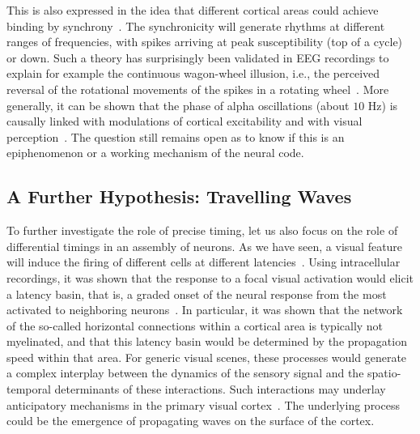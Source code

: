 \documentclass[brainsci, %
               review,accept,pdftex,moreauthors
               ]{Definitions/mdpi}
\begin{document}
This is also expressed in the idea that different cortical areas could achieve binding by synchrony~\citep{fries_mechanism_2005}. The synchronicity will generate rhythms at different ranges of frequencies, with spikes arriving at peak susceptibility (top of a cycle) or down. Such a theory has surprisingly been validated in EEG recordings to explain for example the continuous wagon-wheel illusion, i.e., the perceived reversal of the rotational movements of the spikes in a rotating wheel~\citep{vanrullen_continuous_2006}. More generally, it can be shown that the phase of alpha oscillations (about $10$ Hz) is causally linked with modulations of cortical excitability and with visual perception~\citep{dugue_phase_2011}. The question still remains open as to know if this is an epiphenomenon or a working mechanism of the neural code.
%
\subsection{A Further Hypothesis: Travelling Waves}
%
To further investigate the role of precise timing, let us also focus on the role of differential timings in an assembly of neurons. As we have seen, a visual feature will induce the firing of different cells at different latencies~\citep{celebrini_dynamics_1993}. Using intracellular recordings, it was shown that the response to a focal visual activation would elicit a latency basin, that is, a graded onset of the neural response from the most activated to neighboring neurons~\citep{bringuier_horizontal_1999}. In particular, it was shown that the network of the so-called horizontal connections within a cortical area is typically not myelinated, and that this latency basin would be determined by the propagation speed within that area. For generic visual scenes, these processes would generate a complex interplay between the dynamics of the sensory signal and the spatio-temporal determinants of these interactions. Such interactions may underlay anticipatory mechanisms in the primary visual cortex~\citep{benvenuti_anticipatory_2020,le_bec_horizontal_2022}. The underlying process could be the emergence of propagating waves on the surface of the cortex.
\end{document}
